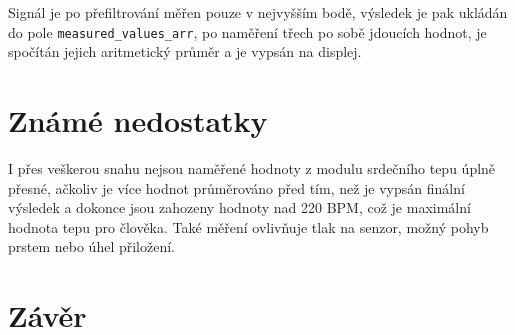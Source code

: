 \documentclass[a4paper, 11pt]{article}
\begin{document}
Signál je po přefiltrování měřen pouze v nejvyšším bodě, výsledek je pak ukládán do pole \verb|measured_values_arr|, po naměření třech po sobě jdoucích hodnot, je spočítán jejich aritmetický průměr a je vypsán na displej. 
\section{Známé nedostatky}
I přes veškerou snahu nejsou naměřené hodnoty z modulu srdečního tepu úplně přesné, ačkoliv je více hodnot průměrováno před tím, než je vypsán finální výsledek a dokonce jsou zahozeny hodnoty nad 220 BPM, což je maximální hodnota tepu pro člověka. Také měření ovlivňuje tlak na senzor, možný pohyb prstem nebo úhel přiložení.
\section{Závěr}
\newpage

\end{document}
